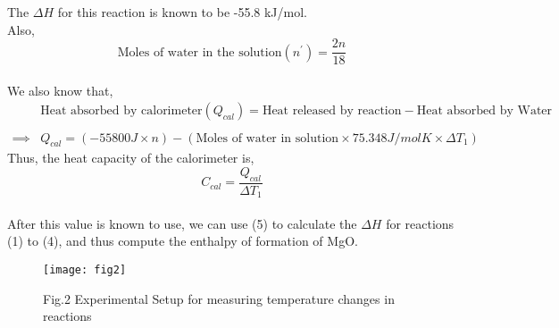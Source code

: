The $\Delta H$ for this reaction is known to be -55.8 kJ/mol.
\\
Also,
\[
  \text{Moles of water in the solution}(n^\prime)  = \frac{2n}{18}
\]
\\
We also know that,
\begin{align*}
&\text{Heat absorbed by calorimeter}(Q_{cal}) = \text{Heat released by reaction} - \text{Heat absorbed by Water} \\ \\
\implies & Q_{cal} = (-55800J \times n) - (\text{Moles of water in solution} \times 75.348 J/mol K \times \Delta T_1)
\end{align*}
Thus, the heat capacity of the calorimeter is,
\[
  C_{cal}=\frac{Q_{cal}}{\Delta T_1} \tag{7}\label{7}
\]
\\
After this value is known to use, we can use (5) to calculate the $\Delta H$ for reactions (1) to (4), and thus compute the enthalpy of formation of MgO.
\cleartoleftpage
\vspace*{6cm}
\begin{figure}[h]
  \begin{center}
    \texttt{[image: fig2]}
    \end{center}
  \caption*{Fig.2 Experimental Setup for measuring temperature changes in reactions}
 \end{figure}
\cleardoublepage
